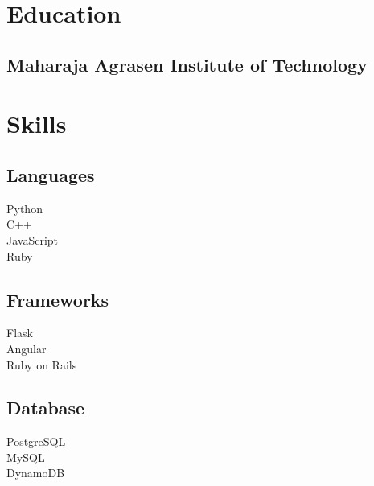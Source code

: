 \documentclass[]{main}
\begin{document}
\begin{minipage}[t]{0.33\textwidth}


\section{Education}

\subsection{Maharaja Agrasen Institute of Technology}
\sectionsep


\section{Skills}
\subsection{Languages}
\textbullet{} Python \\ 
\textbullet{} C++ \\
\textbullet{} JavaScript \\
\textbullet{} Ruby \\
\sectionsep

\subsection{Frameworks}
\textbullet{} Flask \\
\textbullet{} Angular \\
\textbullet{} Ruby on Rails \\
\sectionsep

\subsection{Database}
\textbullet{} PostgreSQL \\
\textbullet{} MySQL \\
\textbullet{} DynamoDB \\
\sectionsep


\end{minipage}
\end{document}
